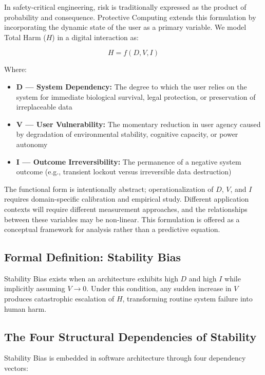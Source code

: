 \documentclass[acmsmall,review]{acmart}
\begin{document}
In safety-critical engineering, risk is traditionally expressed as the product of probability and consequence. Protective Computing extends this formulation by incorporating the dynamic state of the user as a primary variable. We model Total Harm ($H$) in a digital interaction as:

\[
H = f(D, V, I)
\]

Where:

\begin{itemize}
    \item \textbf{D --- System Dependency:} The degree to which the user relies on the system for immediate biological survival, legal protection, or preservation of irreplaceable data
    \item \textbf{V --- User Vulnerability:} The momentary reduction in user agency caused by degradation of environmental stability, cognitive capacity, or power autonomy
    \item \textbf{I --- Outcome Irreversibility:} The permanence of a negative system outcome (e.g., transient lockout versus irreversible data destruction)
\end{itemize}

The functional form is intentionally abstract; operationalization of $D$, $V$, and $I$ requires domain-specific calibration and empirical study. Different application contexts will require different measurement approaches, and the relationships between these variables may be non-linear. This formulation is offered as a conceptual framework for analysis rather than a predictive equation.

\subsection{Formal Definition: Stability Bias}

Stability Bias exists when an architecture exhibits high $D$ and high $I$ while implicitly assuming $V \to 0$. Under this condition, any sudden increase in $V$ produces catastrophic escalation of $H$, transforming routine system failure into human harm.

\subsection{The Four Structural Dependencies of Stability}

Stability Bias is embedded in software architecture through four dependency vectors:
\end{document}
